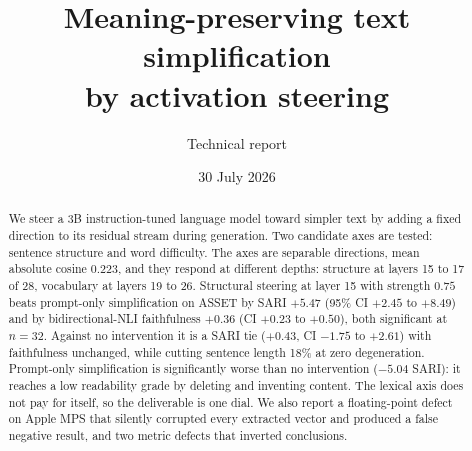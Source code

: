 \documentclass[twocolumn,10pt,a4paper]{article}
\title{\vspace{-1.2em}\bfseries Meaning-preserving text simplification\\
by activation steering}
\author{Technical report}
\date{30 July 2026}
\begin{document}
\maketitle

\begin{abstract}
\noindent
We steer a 3B instruction-tuned language model toward simpler text by adding a
fixed direction to its residual stream during generation. Two candidate axes are
tested: sentence structure and word difficulty. The axes are separable
directions, mean absolute cosine $0.223$, and they respond at different depths:
structure at layers 15 to 17 of 28, vocabulary at layers 19 to 26. Structural
steering at layer 15 with strength $0.75$ beats prompt-only simplification on
ASSET by SARI $+5.47$ (95\% CI $+2.45$ to $+8.49$) and by bidirectional-NLI
faithfulness $+0.36$ (CI $+0.23$ to $+0.50$), both significant at $n{=}32$.
Against no intervention it is a SARI tie ($+0.43$, CI $-1.75$ to $+2.61$) with
faithfulness unchanged, while cutting sentence length 18\% at zero degeneration.
Prompt-only simplification is significantly worse than no intervention
($-5.04$ SARI): it reaches a low readability grade by deleting and inventing
content. The lexical axis does not pay for itself, so the deliverable is one
dial. We also report a floating-point defect on Apple MPS that silently
corrupted every extracted vector and produced a false negative result, and two
metric defects that inverted conclusions.
\end{abstract}


\begin{figure}[!t]
\centering
{}
\end{figure}
\end{document}
